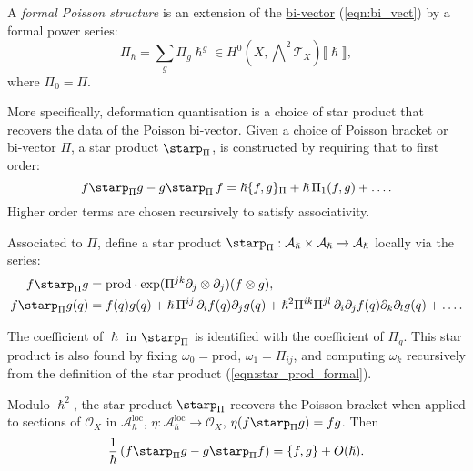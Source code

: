     \begin{defn} 
    A \emph{formal Poisson structure} is an extension of the \hyperref[defn:bi_vect]{bi-vector} (\ref{eqn:bi_vect}) by a formal power series:
    \[ \Pi_{\hslash} = \sum_{g} \Pi_g \hslash^g \in H^0(X,\bigwedge\nolimits^{\!2} \mathcal{T}_X)\lBrack \hslash \rBrack , \]
    where \(\Pi_0 = \Pi\).
    \end{defn}
    More specifically, deformation quantisation is a choice of star product that recovers the data of the Poisson bi-vector. Given a choice of Poisson bracket or bi-vector \(\Pi\), a star product \( \starp_{\Pi}\), is constructed by requiring that to first order:
    \[ f \starp_{\Pi } g - g \starp_{\Pi} \,f = \hslash \{f,g\}_{\Pi} + \hslash \,\Pi_{1}(f,g) + \dots.  \]
    Higher order terms are chosen recursively to satisfy associativity.
    \begin{defn} 
    \label{defn:star_prod_pois}
    Associated to \( \Pi\), define a star product \( \starp_{\Pi}  : \mathcal{A}_\hslash \times  \mathcal{A}_\hslash \rightarrow \mathcal{A}_\hslash \) locally via the series:
    \begin{align}
    \label{eqn:star_prod}
    f \starp_{\Pi} g  &= \mathrm{prod} \cdot \exp( \Pi^{jk} \partial_j \otimes \partial_j ) (f \otimes g) , \\
    f \starp_{\Pi} g (q)  &= f(q) g(q) + \hslash \,\Pi^{ij}\, \partial_i f(q) \partial_j g(q) + \hslash^2 \Pi^{ik} \Pi^{jl} \, \partial_i \partial_j f(q) \partial_k \partial_l g(q) + \dots . 
    \end{align}
    \end{defn}
    The coefficient of \( \hslash\) in \( \starp_{\Pi}\) is identified with the coefficient of \( \Pi_g\). This star product is also found by fixing \( \omega_0 = \mathrm{prod}\), \( \omega_1 = \Pi_{ij}\), and computing  \( \omega_k\) recursively from the definition of the star product (\ref{eqn:star_prod_formal}).
    
    Modulo \(\hslash^2\), the star product \( \starp_{\Pi}\) recovers the Poisson bracket when applied to sections of \( \mathcal{O}_X\) in \( \mathcal{A}^{\text{loc}}_{\hslash}\),  \( \eta : \mathcal{A}^{\text{loc}}_\hslash \rightarrow \mathcal{O}_X\),
    \( \eta ( f \starp_{\Pi} g )= f g \). Then
    \begin{align}
        \label{eqn:star_to_pois}
        \frac{1}{\hslash } \left( f \starp_{\Pi} g - g \starp_{\Pi} f \right) = \{f,g\} + O(\hslash).
    \end{align}    
    
